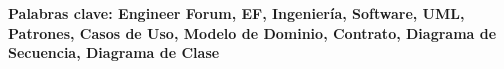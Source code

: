 \textbf{\small Palabras clave: Engineer Forum, EF, Ingenier\'{i}a, Software, UML, Patrones, Casos de Uso, Modelo de Dominio, Contrato, Diagrama de Secuencia, Diagrama de Clase}\\[2.0cm]



%

\newpage{\pagestyle{empty}\cleardoublepage}
